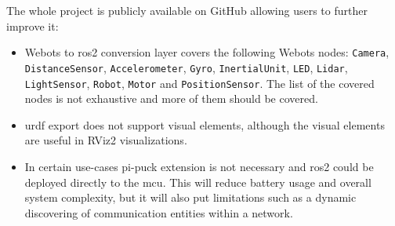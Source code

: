 The whole project is publicly available on GitHub allowing users to further improve it:
\begin{itemize}
    \item Webots to \ac{ros2} conversion layer covers the following Webots nodes: \texttt{Camera}, \texttt{DistanceSensor}, \texttt{Accelerometer}, \texttt{Gyro}, \texttt{InertialUnit}, \texttt{LED}, \texttt{Lidar}, \texttt{LightSensor}, \texttt{Robot}, \texttt{Motor} and \texttt{PositionSensor}. The list of the covered nodes is not exhaustive and more of them should be covered.
    \item \ac{urdf} export does not support visual elements, although the visual elements are useful in RViz2 visualizations.
    \item In certain use-cases pi-puck extension is not necessary and \ac{ros2} could be deployed directly to the \ac{mcu}.
    This will reduce battery usage and overall system complexity, but it will also put limitations such as a dynamic discovering of communication entities within a network.
\end{itemize}
